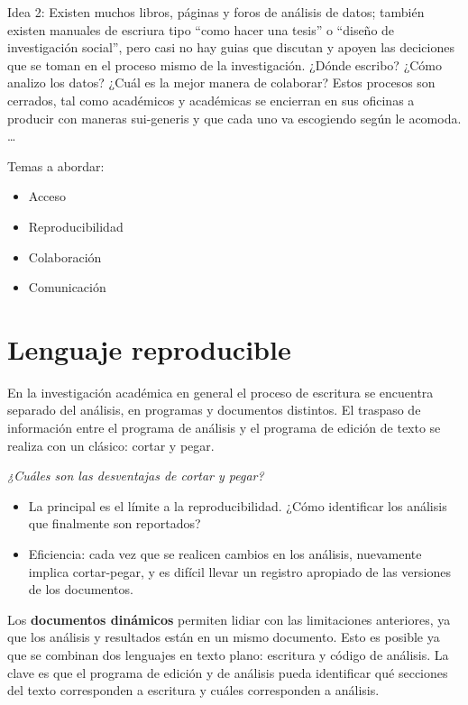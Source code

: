 \documentclass[
  11pt,
]{book}
\providecommand{\tightlist}{%
  \setlength{\itemsep}{0pt}\setlength{\parskip}{0pt}}
\begin{document}
Idea 2: Existen muchos libros, páginas y foros de análisis de datos; también existen manuales de escriura tipo ``como hacer una tesis'' o ``diseño de investigación social'', pero casi no hay guias que discutan y apoyen las deciciones que se toman en el proceso mismo de la investigación. ¿Dónde escribo? ¿Cómo analizo los datos? ¿Cuál es la mejor manera de colaborar? Estos procesos son cerrados, tal como académicos y académicas se encierran en sus oficinas a producir con maneras sui-generis y que cada uno va escogiendo según le acomoda. \ldots{}

Temas a abordar:

\begin{itemize}
\tightlist
\item
  Acceso
\item
  Reproducibilidad
\item
  Colaboración
\item
  Comunicación
\end{itemize}

\hypertarget{lenguaje-reproducible}{%
\chapter{Lenguaje reproducible}\label{lenguaje-reproducible}}

En la investigación académica en general el proceso de escritura se encuentra separado del análisis, en programas y documentos distintos. El traspaso de información entre el programa de análisis y el programa de edición de texto se realiza con un clásico: cortar y pegar.

\emph{¿Cuáles son las desventajas de cortar y pegar?}

\begin{itemize}
\item
  La principal es el límite a la reproducibilidad. ¿Cómo identificar los análisis que finalmente son reportados?
\item
  Eficiencia: cada vez que se realicen cambios en los análisis, nuevamente implica cortar-pegar, y es difícil llevar un registro apropiado de las versiones de los documentos.
\end{itemize}

Los \textbf{documentos dinámicos} permiten lidiar con las limitaciones anteriores, ya que los análisis y resultados están en un mismo documento. Esto es posible ya que se combinan dos lenguajes en texto plano: escritura y código de análisis. La clave es que el programa de edición y de análisis pueda identificar qué secciones del texto corresponden a escritura y cuáles corresponden a análisis.
\end{document}
